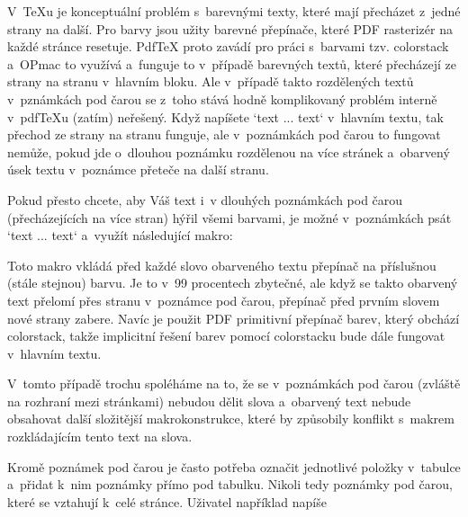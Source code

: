 {V~TeXu je konceptuální problém s~barevnými texty, které mají přecházet z~jedné strany na další. Pro barvy jsou užity barevné přepínače, které PDF rasterizér na každé stránce resetuje. PdfTeX proto zavádí pro práci s~barvami tzv. colorstack a~OPmac to využívá a~funguje to v~případě barevných textů, které přecházejí ze strany na stranu v~hlavním bloku. Ale v~případě takto rozdělených textů v~pznámkách pod čarou se z~toho stává  hodně komplikovaný problém interně v~pdfTeXu (zatím) neřešený. Když napíšete `{\localcolor\Red text ... text}` v~hlavním textu, tak přechod ze strany na stranu funguje, ale v~poznámkách pod čarou to fungovat nemůže, pokud jde o~dlouhou poznámku rozdělenou na více stránek a~obarvený úsek textu v~poznámce přeteče na další stranu. 



Pokud přesto chcete, aby Váš text i~v dlouhých poznámkách pod čarou (přecházejících na více stran) hýřil všemi barvami, je možné v~poznámkách psát `{\fnotecolor\Red text ... text}` a~využít následující makro: 

\begtt
\def\fnotecolor#1{\expandafter\definecolor#1%
   \expandafter\fnoteRedA\expandafter{\iffalse}\fi} 
\def\definecolor#1#2{\def\everyColor{#2 k}} 
\long{} 
\long\def\everyspacecolor#1 {\ifx\end#1\end \unskip \else  
   \pdfliteral{\everyColor}#1 \expandafter\everyspacecolor\fi 
} 
 
\endtt


Toto makro vkládá před každé slovo obarveného textu přepínač na příslušnou (stále stejnou) barvu. Je to v~99 procentech zbytečné, ale když se takto obarvený text přelomí přes stranu v~poznámce pod čarou, přepínač před prvním slovem nové strany zabere. Navíc je použit PDF primitivní přepínač barev, který obchází colorstack, takže implicitní řešení barev pomocí colorstacku  bude dále fungovat v~hlavním textu. 



V~tomto případě trochu spoléháme na to, že se v~poznámkách pod čarou (zvláště na rozhraní mezi stránkami) nebudou dělit slova a~obarvený text nebude obsahovat další složitější makrokonstrukce, které by způsobily konflikt s~makrem rozkládajícím tento text na slova. 


 


Kromě poznámek pod čarou je často potřeba označit jednotlivé položky v~tabulce a~přidat k~nim poznámky přímo pod tabulku. Nikoli tedy poznámky pod čarou, které se vztahují k~celé stránce. Uživatel například napíše 

}
